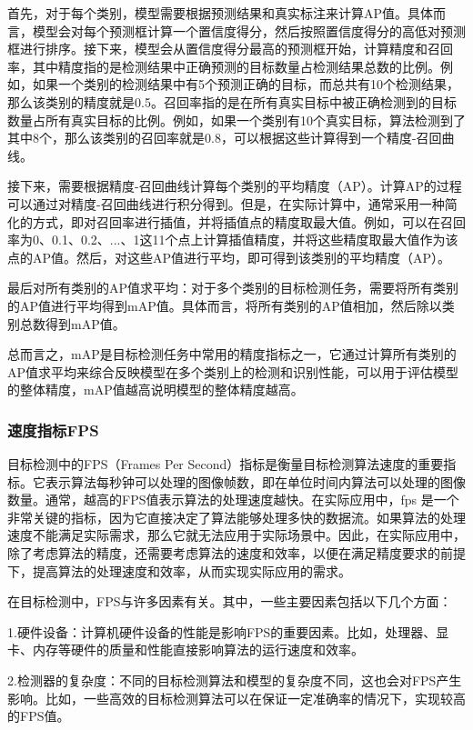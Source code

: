 \documentclass{ctexart}
\numberwithin{equation}{section}%
\numberwithin{figure}{section}%
\numberwithin{table}{section}%
\begin{document}
	首先，对于每个类别，模型需要根据预测结果和真实标注来计算AP值。具体而言，模型会对每个预测框计算一个置信度得分，然后按照置信度得分的高低对预测框进行排序。接下来，模型会从置信度得分最高的预测框开始，计算精度和召回率，其中精度指的是检测结果中正确预测的目标数量占检测结果总数的比例。例如，如果一个类别的检测结果中有5个预测正确的目标，而总共有10个检测结果，那么该类别的精度就是0.5。召回率指的是在所有真实目标中被正确检测到的目标数量占所有真实目标的比例。例如，如果一个类别有10个真实目标，算法检测到了其中8个，那么该类别的召回率就是0.8，可以根据这些计算得到一个精度-召回曲线。
	
	接下来，需要根据精度-召回曲线计算每个类别的平均精度（AP）。计算AP的过程可以通过对精度-召回曲线进行积分得到。但是，在实际计算中，通常采用一种简化的方式，即对召回率进行插值，并将插值点的精度取最大值。例如，可以在召回率为0、0.1、0.2、...、1这11个点上计算插值精度，并将这些精度取最大值作为该点的AP值。然后，对这些AP值进行平均，即可得到该类别的平均精度（AP）。
	
	最后对所有类别的AP值求平均：对于多个类别的目标检测任务，需要将所有类别的AP值进行平均得到mAP值。具体而言，将所有类别的AP值相加，然后除以类别总数得到mAP值。
	
	总而言之，mAP是目标检测任务中常用的精度指标之一，它通过计算所有类别的AP值求平均来综合反映模型在多个类别上的检测和识别性能，可以用于评估模型的整体精度，mAP值越高说明模型的整体精度越高。
	
	\subsubsection{速度指标FPS}
	目标检测中的FPS（Frames Per Second）指标是衡量目标检测算法速度的重要指标。它表示算法每秒钟可以处理的图像帧数，即在单位时间内算法可以处理的图像数量。通常，越高的FPS值表示算法的处理速度越快。在实际应用中，fps 是一个非常关键的指标，因为它直接决定了算法能够处理多快的数据流。如果算法的处理速度不能满足实际需求，那么它就无法应用于实际场景中。因此，在实际应用中，除了考虑算法的精度，还需要考虑算法的速度和效率，以便在满足精度要求的前提下，提高算法的处理速度和效率，从而实现实际应用的需求。
	
	在目标检测中，FPS与许多因素有关。其中，一些主要因素包括以下几个方面：
	
	1.硬件设备：计算机硬件设备的性能是影响FPS的重要因素。比如，处理器、显卡、内存等硬件的质量和性能直接影响算法的运行速度和效率。
	
	2.检测器的复杂度：不同的目标检测算法和模型的复杂度不同，这也会对FPS产生影响。比如，一些高效的目标检测算法可以在保证一定准确率的情况下，实现较高的FPS值。
	
\end{document}
